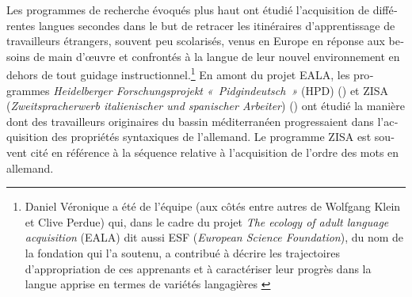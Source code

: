 \documentclass[output=paper]{langscibook}
\begin{document}
\begin{otherlanguage}{french}
Les programmes de recherche évoqués plus haut ont étudié l’acquisition de différentes langues secondes dans le but de retracer les itinéraires d’apprentissage de travailleurs étrangers, souvent peu scolarisés, venus en Europe en réponse aux besoins de main d’œuvre et confrontés à la langue de leur nouvel environnement en dehors de tout guidage instructionnel.\footnote{Daniel Véronique a été de l’équipe (aux côtés entre autres de Wolfgang Klein et Clive Perdue) qui, dans le cadre du projet \textit{The ecology of adult language acquisition} (EALA) dit aussi ESF (\textit{European Science Found\-a\-tion}), du nom de la fondation qui l'a soutenu, a contribué à décrire les trajectoires d’appropriation de ces apprenants et à caractériser leur progrès dans la langue apprise en termes de variétés langagières \citep{Perdue1993vol2}} En amont du projet EALA, les programmes \textit{Heidelberger Forschungsprojekt} \textit{«~Pidgin\-deutsch~»} (HPD) (\citealt{DittmarKlein1975}) et ZISA (\textit{Zweitspracherwerb italienischer und spanischer Arbeiter}) (\citealt{MeiselEtAl1981}) ont étudié la manière dont des travailleurs originaires du bassin méditerranéen progressaient dans l’acquisition des propriétés syntaxiques de l’allemand. Le programme ZISA est souvent cité en référence à la séquence relative à l’acquisition de l’ordre des mots en allemand. 

\begin{table}
\caption{Hiérarchie des stades d’acquisition (ZISA) (\citealt[45]{Pienemann1999}). Les exemples sont ceux de Pienemann.\label{tab:felce:2}}
\end{table}
 


\end{otherlanguage}
\end{document}
